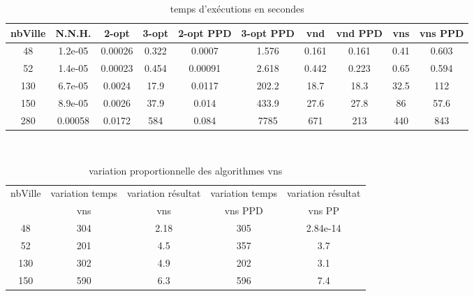 \documentclass[12pt,a4paper]{article}
\begin{document}
\begin{table}[!h]
\centering
\begin{tabular}{|*{10}{c|}}
  \hline
  nbVille & N.N.H. & 2-opt & 3-opt & 2-opt PPD & 3-opt PPD & vnd & vnd PPD & vns & vns PPD \\
  \hline
  48 & 1.2e-05 & 0.00026 & 0.322 & 0.0007 & 1.576 & 0.161 & 0.161 & 0.41 & 0.603 \\
  52 & 1.4e-05 & 0.00023 & 0.454 & 0.00091 & 2.618 & 0.442 & 0.223 & 0.65 & 0.594 \\
  130 & 6.7e-05 & 0.0024 & 17.9 & 0.0117 & 202.2 & 18.7 & 18.3 & 32.5 & 112 \\
  150 & 8.9e-05 & 0.0026 & 37.9 & 0.014 & 433.9 & 27.6 & 27.8 & 86 & 57.6 \\
  280 & 0.00058 & 0.0172 & 584 & 0.084 & 7785 & 671 & 213 & 440 & 843 \\ 
  \hline
\end{tabular}
\caption{temps d’exécutions en secondes}
\label{NNHtemps}
\end{table}
~\\
\begin{table}[!h]
\centering
\begin{tabular}{|*{5}{c|}}
  \hline
  nbVille & variation temps & variation résultat & variation temps & variation résultat \\
  ~ & vns & vns & vns PPD & vns PP \\
  \hline
  48 & 304 & 2.18 & 305 & 2.84e-14 \\ 
  52 & 201 & 4.5 & 357 & 3.7 \\
  130 & 302 & 4.9 & 202 & 3.1 \\
  150 & 590 & 6.3 & 596 & 7.4 \\
  \hline
\end{tabular}
\caption{variation proportionnelle des algorithmes vns}
\label{variationvnsNNH}
\end{table}
~\\
\end{document}
